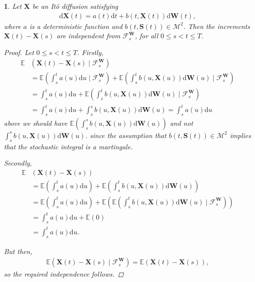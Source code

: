 \documentclass[english]{article}
\newcommand{\comment}[1]{\color{blue}#1\color{black}}
\numberwithin{equation}{section}
\numberwithin{figure}{section}
\theoremstyle{bolddescit}
\theoremstyle{definition}
\theoremstyle{definition}
\theoremstyle{plain}
\newtheorem{lemma}[theorem]{\protect\lemmaname}
\theoremstyle{plain}
\theoremstyle{bolddesc}
\theoremstyle{plain}
\theoremstyle{remark}
\providecommand{\lemmaname}{Lemma}
\begin{document}
\begin{lemma}\label{lem:fp-ito-diffusion-indep-increments}
  Let $\mathbf{X}$ be an It\^o diffusion satisfying
  \begin{align}\label{eq:fp-ito-diffusion-deterministic-drift}
    \mathrm{d}\mathbf{X}(t) = a(t) \mathrm{d}t + b(t,\mathbf{X}(t)) \mathrm{d}\mathbf{W}(t),
  \end{align}
  where $a$ is a deterministic function and $b(t,\mathbf{S}(t)) \in \mathcal{M}^2$. Then the increments $\mathbf{X}(t) - \mathbf{X}(s)$ are independent from $\mathcal{F}^\mathbf{W}_s$, for all $0 \le s < t \le T$.

  \begin{proof}
    Let $0 \le s < t \le T$. Firstly,
    \begin{align*}
      \mathbb{E}&(\mathbf{X}(t) - \mathbf{X}(s) \mid \mathcal{F}^\mathbf{W}_s)\\
      &= \mathbb{E}\left(\int_s^t a(u) \mathrm{d}u \mid \mathcal{F}^\mathbf{W}_s\right) + \mathbb{E}\left(\int_s^t b(u,\mathbf{X}(u)) \mathrm{d}\mathbf{W}(u) \mid \mathcal{F}^\mathbf{W}_s\right)\\
      &= \int_s^t a(u) \mathrm{d}u + \mathbb{E}\left(\int_s^t b(u,\mathbf{X}(u)) \mathrm{d}\mathbf{W}(u) \mid \mathcal{F}^\mathbf{W}_s\right) \tag{$a$ deterministic}\\
      &= \int_s^t a(u) \mathrm{d}u + \int_s^s b(u,\mathbf{X}(u)) \mathrm{d}\mathbf{W}(u)
      = \int_s^t a(u) \mathrm{d}u
    \end{align*}
\comment{above we should have $\mathbb{E}\left(\int_s^s b(u,\mathbf{X}(u)) \mathrm{d}\mathbf{W}(u)\right)$ and not $\int_s^s b(u,\mathbf{X}(u)) \mathrm{d}\mathbf{W}(u)$.}
    since the assumption that $b(t,\mathbf{S}(t)) \in \mathcal{M}^2$ implies that the stochastic integral is a martingale.

    Secondly,
    \begin{align*}
      \mathbb{E}&(\mathbf{X}(t) - \mathbf{X}(s))\\
      &= \mathbb{E}\left(\int_s^t a(u) \mathrm{d}u\right) + \mathbb{E}\left(\int_s^t b(u,\mathbf{X}(u)) \mathrm{d}\mathbf{W}(u)\right)\\
      &= \mathbb{E}\left(\int_s^t a(u) \mathrm{d}u\right) + \mathbb{E}\left(\mathbb{E}\left(\int_s^t b(u,\mathbf{X}(u)) \mathrm{d}\mathbf{W}(u) \mid \mathcal{F}^\mathbf{W}_s\right)\right) \tag{tower property}\\
      &= \int_s^t a(u) \mathrm{d}u + \mathbb{E}\left(0\right) \tag{as before}\\
      &= \int_s^t a(u) \mathrm{d}u.
    \end{align*}

    But then,
    \begin{align*}
      \mathbb{E}(\mathbf{X}(t) - \mathbf{X}(s) \mid \mathcal{F}^\mathbf{W}_s)
      = \mathbb{E}(\mathbf{X}(t) - \mathbf{X}(s)),
    \end{align*}
    so the required independence follows.
  \end{proof}
\end{lemma}
\end{document}

